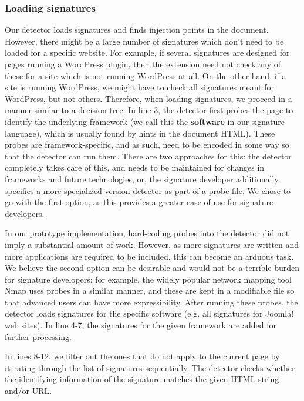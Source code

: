 \subsubsection{Loading signatures} \label{loading_signatures}
Our detector loads signatures and finds injection points in the document. However, there might be a large number of signatures which don't need to be loaded for a specific website. For example, if several signatures are designed for pages running a WordPress plugin, then the extension need not check any of these for a site which is not running WordPress at all. On the other hand, if a site is running WordPress, we might have to check all signatures meant for WordPress, but not others. Therefore, when loading signatures, we proceed in a manner similar to a decision tree. In line 3, the detector first probes the page to identify the underlying framework (we call this the \textbf{software} in our signature language), which is usually found by hints in the document HTML). These probes are framework-specific, and as such, need to be encoded in some way so that the detector can run them. There are two approaches for this: the detector completely takes care of this, and needs to be maintained for changes in frameworks and future technologies, or, the signature developer additionally specifies a more specialized version detector as part of a probe file. We chose to go with the first option, as this provides a greater ease of use for signature developers. 

In our prototype implementation, hard-coding probes into the detector did not imply a substantial amount of work. However, as more signatures are written and more applications are required to be included, this can become an arduous task. We believe the second option can be desirable and would not be a terrible burden for signature developers: for example, the widely popular network mapping tool Nmap \cite{nMap} uses probes in a similar manner, and these are kept in a modifiable file so that advanced users can have more expressibility. After running these probes, the detector loads signatures for the specific software (e.g. all signatures for Joomla! web sites). In line 4-7, the signatures for the given framework are added for further processing.

In lines 8-12, we filter out the ones that do not apply to the current page by iterating through the list of signatures sequentially. The detector checks whether the identifying information of the signature matches the given HTML string and/or URL.

